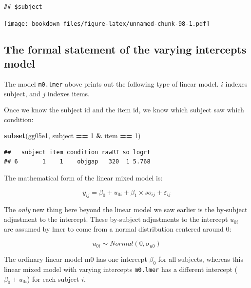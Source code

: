 \documentclass[12pt,]{krantz}
\newenvironment{Shaded}{\begin{snugshade}}{\end{snugshade}}
\newcommand{\DecValTok}[1]{\textcolor[rgb]{0.00,0.00,0.81}{#1}}
\newcommand{\KeywordTok}[1]{\textcolor[rgb]{0.13,0.29,0.53}{\textbf{#1}}}
\newcommand{\NormalTok}[1]{#1}
\newcommand{\OperatorTok}[1]{\textcolor[rgb]{0.81,0.36,0.00}{\textbf{#1}}}
\newcommand{\StringTok}[1]{\textcolor[rgb]{0.31,0.60,0.02}{#1}}
\begin{document}
\begin{verbatim}
## $subject
\end{verbatim}

\texttt{[image: bookdown\_files/figure-latex/unnamed-chunk-98-1.pdf]}

\hypertarget{the-formal-statement-of-the-varying-intercepts-model}{%
\subsection{The formal statement of the varying intercepts model}\label{the-formal-statement-of-the-varying-intercepts-model}}

The model \texttt{m0.lmer} above prints out the following type of linear model. \(i\) indexes subject, and \(j\) indexes items.

Once we know the subject id and the item id, we know which subject saw which condition:

\begin{Shaded}
\begin{Highlighting}[]
\KeywordTok{subset}\NormalTok{(gg05e1, subject }\OperatorTok{==}\StringTok{ }\DecValTok{1} \OperatorTok{&}\StringTok{ }\NormalTok{item }\OperatorTok{==}\StringTok{ }\DecValTok{1}\NormalTok{)}
\end{Highlighting}
\end{Shaded}

\begin{verbatim}
##   subject item condition rawRT so logrt
## 6       1    1    objgap   320  1 5.768
\end{verbatim}

The mathematical form of the linear mixed model is:

\begin{equation}
y_{ij} = \beta_0 + u_{0i}+\beta_1\times so_{ij} + \varepsilon_{ij}
\end{equation}

The \emph{only} new thing here beyond the linear model we saw earlier is the by-subject adjustment to the intercept. These by-subject adjustments to the intercept \(u_{0i}\) are assumed by lmer to come from a normal distribution centered around 0:

\begin{equation}
u_{0i} \sim Normal(0,\sigma_{u0})
\end{equation}

The ordinary linear model m0 has one intercept \(\beta_0\) for all subjects, whereas this linear mixed model with varying intercepts \texttt{m0.lmer} has a different intercept (\(\beta_0 + u_{0i}\)) for each subject \(i\).
\end{document}
